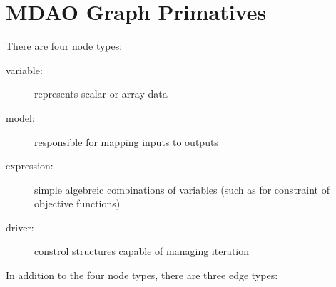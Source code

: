 
\section{MDAO Graph Primatives}
There are four node types:  
\begin{description}
\item[variable: ] represents scalar or array data
\item[model:] responsible for mapping inputs to outputs
\item[expression:] simple algebreic combinations of variables (such as for constraint of objective functions)
\item[driver:] constrol structures capable of managing iteration
\end{description}

In addition to the four node types, there are three edge types: 

